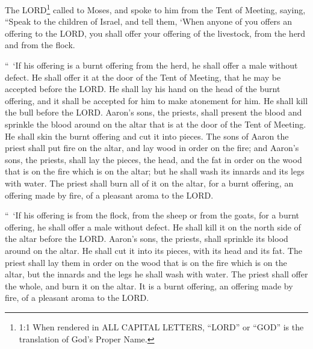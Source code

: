 






\vspace{-1.36in}

\mychapter{} \myverse*{}The LORD\footnote{1:1 When rendered in ALL CAPITAL LETTERS, “LORD” or “GOD” is the translation of God’s Proper Name.}
called to Moses, and spoke to him from the Tent of Meeting, saying,
\myverse{}“Speak to the children of Israel, and tell them, ‘When anyone of you offers
an offering to the LORD, you shall offer your offering of the livestock, from the herd and from the flock.


\myverse{}“ ‘If his offering is a burnt offering from the herd, he shall offer
a male without defect. He shall offer it at the door of the Tent of Meeting, that he may be accepted before
the LORD.
\myverse{}He shall lay his hand on the head of the burnt offering, and it shall be accepted
for him to make atonement for him.
\myverse{}He shall kill the bull before the LORD. Aaron’s sons, the priests, shall present
the blood and sprinkle the blood around on the altar that is at the door of the Tent of Meeting.
\myverse{}He shall skin the burnt offering and cut it into pieces.
\myverse{}The sons of Aaron the priest shall put fire on the altar, and lay wood in order
on the fire;
\myverse{}and Aaron’s sons, the priests, shall lay the pieces, the head, and the fat in
order on the wood that is on the fire which is on the altar;
\myverse{}but he shall wash its innards and its legs with water. The priest shall burn
all of it on the altar, for a burnt offering, an offering made by fire, of a pleasant aroma to the LORD.


\myverse{}“ ‘If his offering is from the flock, from the sheep or from the
goats, for a burnt offering, he shall offer a male without defect.
\myverse{}He shall kill it on the north side of the altar before the LORD. Aaron’s sons,
the priests, shall sprinkle its blood around on the altar.
\myverse{}He shall cut it into its pieces, with its head and its fat. The priest shall
lay them in order on the wood that is on the fire which is on the altar,
\myverse{}but the innards and the legs he shall wash with water. The priest shall offer
the whole, and burn it on the altar. It is a burnt offering, an offering made by fire, of a pleasant aroma
to the LORD.


